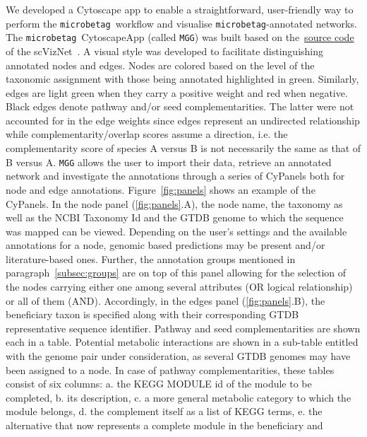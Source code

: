 \documentclass[sn-mathphys,Numbered]{sn-jnl}  %
\theoremstyle{thmstyleone}%
\theoremstyle{thmstyletwo}%
\theoremstyle{thmstylethree}%
\newcommand{\microbetag}{\texttt{microbetag}}
\begin{document}
        We developed a Cytoscape app to enable a straightforward, user-friendly way to perform the \microbetag~workflow and visualise \microbetag-annotated networks.
        The \microbetag~CytoscapeApp (called \texttt{MGG}) was built based on the~\href{https://github.com/RBVI/scNetViz}{source code} of the scVizNet~\cite{choudhary2021scnetviz}.
        A visual style was developed to facilitate distinguishing annotated nodes and edges.
        Nodes are colored based on the level of the taxonomic assignment with those being annotated highlighted in green.
        Similarly, edges are light green when they carry a positive weight and red when negative. 
        Black edges denote pathway and/or seed complementarities.
        The latter were not accounted for in the edge weights since edges represent an undirected relationship while complementarity/overlap scores assume a direction, i.e. the complementarity score of species A versus B is not necessarily the same as that of B versus A.
        \texttt{MGG} allows the user to import their data, retrieve an annotated network and investigate the annotations through a series of CyPanels both for node and edge annotations.
        Figure~\ref{fig:panels} shows an example of the CyPanels.
        In the node panel (\ref{fig:panels}.A), the node name, the taxonomy as well as the NCBI Taxonomy Id and the GTDB genome to which the sequence was mapped can be viewed. 
        Depending on the user's settings and the available annotations for a node, genomic based predictions may be present and/or literature-based ones.
        Further, the annotation groups mentioned in paragraph~\ref{subsec:groups} are on top of this panel allowing for the selection of the nodes carrying either one among several attributes (OR logical relationship) or all of them (AND).
        Accordingly, in the edges panel (\ref{fig:panels}.B), the beneficiary taxon is specified along with their corresponding GTDB representative sequence identifier.
        Pathway and seed complementarities are shown each in a table.
        Potential metabolic interactions are shown in a sub-table entitled with the genome pair under consideration, as several GTDB genomes may have been assigned to a node.
        In case of pathway complementarities, these tables consist of six columns: a. the KEGG MODULE id of the module to be completed, b. its description, 
        c. a more general metabolic category to which the module belongs,
        d. the complement itself as a list of KEGG terms, 
        e. the alternative that now represents a complete module in the beneficiary and
\end{document}
